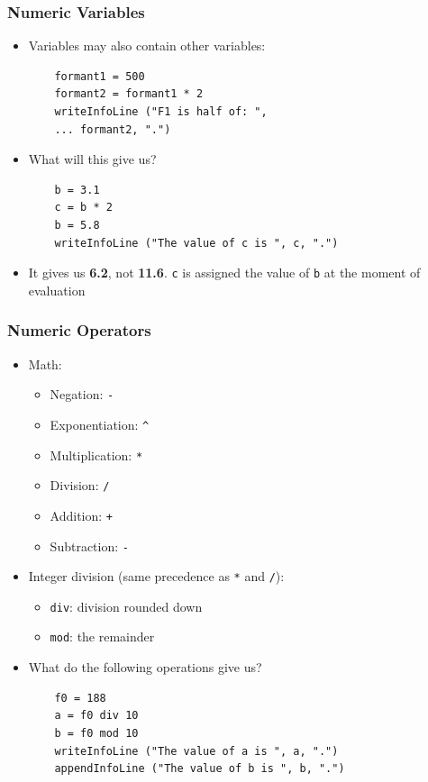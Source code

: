 \documentclass[handout]{beamer}
\begin{document}
\begin{frame}[fragile]
\frametitle{Numeric Variables}
\begin{itemize}
    \item <1-> Variables may also contain other variables:
    \begin{verbatim}
    formant1 = 500
    formant2 = formant1 * 2
    writeInfoLine ("F1 is half of: ",
    ... formant2, ".")
    \end{verbatim}

    \item <2-> What will this give us?
    \begin{verbatim}
    b = 3.1
    c = b * 2
    b = 5.8
    writeInfoLine ("The value of c is ", c, ".")
    \end{verbatim}

    \item <3-> It gives us \textbf{6.2}, not \textbf{11.6}. \texttt{c} is assigned the value of \texttt{b} at the moment of evaluation
\end{itemize}
\end{frame}

\begin{frame}[fragile]
\frametitle{Numeric Operators}
\begin{itemize}
    \item <1-> Math:
    \begin{itemize}
        \item Negation: \texttt{-}
        \item Exponentiation: \texttt{\^}
        \item Multiplication: \texttt{*}
        \item Division: \texttt{/}
        \item Addition: \texttt{+}
        \item Subtraction: \texttt{-}
    \end{itemize}

    \item <2-> Integer division (same precedence as \texttt{*} and \texttt{/}):
    \begin{itemize}
        \item \texttt{div}: division rounded down
        \item \texttt{mod}: the remainder
    \end{itemize}

    \item <3-> What do the following operations give us?
    \begin{verbatim}
    f0 = 188
    a = f0 div 10
    b = f0 mod 10
    writeInfoLine ("The value of a is ", a, ".")
    appendInfoLine ("The value of b is ", b, ".")
    \end{verbatim}
\end{itemize}
\end{frame}
\end{document}
